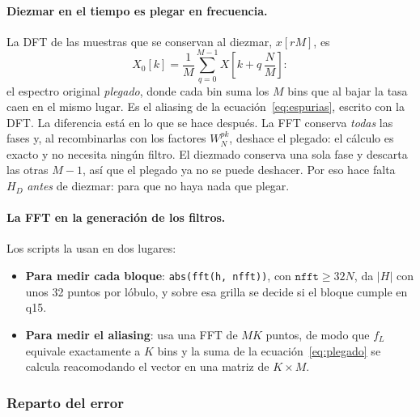 \documentclass[11pt,a4paper]{article}
\begin{document}
\paragraph{Diezmar en el tiempo es plegar en frecuencia.} La DFT de las
muestras que se conservan al diezmar, $x[rM]$, es
\begin{equation}
  X_0[k] = \frac{1}{M}\sum_{q=0}^{M-1} X\!\left[k + q\,\frac{N}{M}\right]:
  \label{eq:plegado}
\end{equation}
el espectro original \emph{plegado}, donde cada bin suma los $M$ bins que al
bajar la tasa caen en el mismo lugar. Es el aliasing de la
ecuación~\eqref{eq:espurias}, escrito con la DFT. La diferencia está en lo
que se hace después. La FFT conserva \emph{todas} las fases y, al
recombinarlas con los factores $W_N^{pk}$, deshace el plegado: el cálculo es
exacto y no necesita ningún filtro. El diezmado conserva una sola fase y
descarta las otras $M-1$, así que el plegado ya no se puede deshacer. Por
eso hace falta $H_D$ \emph{antes} de diezmar: para que no haya nada que
plegar.

\paragraph{La FFT en la generación de los filtros.} Los scripts la usan en
dos lugares:
\begin{itemize}[nosep]
  \item \textbf{Para medir cada bloque}: \texttt{abs(fft(h, nfft))}, con
        $\texttt{nfft} \ge 32N$, da $|H|$ con unos 32 puntos por lóbulo, y
        sobre esa grilla se decide si el bloque cumple en q15.
  \item \textbf{Para medir el aliasing}:  usa
        una FFT de $MK$ puntos, de modo que $f_L$ equivale exactamente a $K$
        bins y la suma de la ecuación~\eqref{eq:plegado} se calcula
        reacomodando el vector en una matriz de $K \times M$.
\end{itemize}

\subsubsection{Reparto del error}
\end{document}

